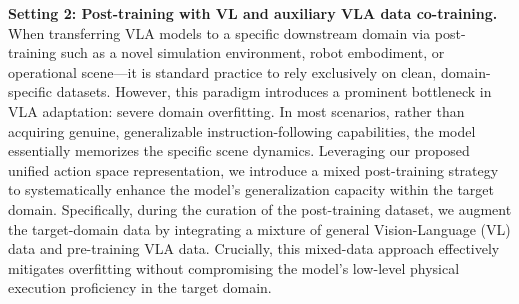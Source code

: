 

\textbf{Setting 2: Post-training with VL and auxiliary VLA data co-training.} When transferring VLA models to a specific downstream domain via post-training such as a novel simulation environment, robot embodiment, or operational scene—it is standard practice to rely exclusively on clean, domain-specific datasets. However, this paradigm introduces a prominent bottleneck in VLA adaptation: severe domain overfitting. In most scenarios, rather than acquiring genuine, generalizable instruction-following capabilities, the model essentially memorizes the specific scene dynamics. Leveraging our proposed unified action space representation, we introduce a mixed post-training strategy to systematically enhance the model's generalization capacity within the target domain. Specifically, during the curation of the post-training dataset, we augment the target-domain data by integrating a mixture of general Vision-Language (VL) data and pre-training VLA data. Crucially, this mixed-data approach effectively mitigates overfitting without compromising the model's low-level physical execution proficiency in the target domain.


